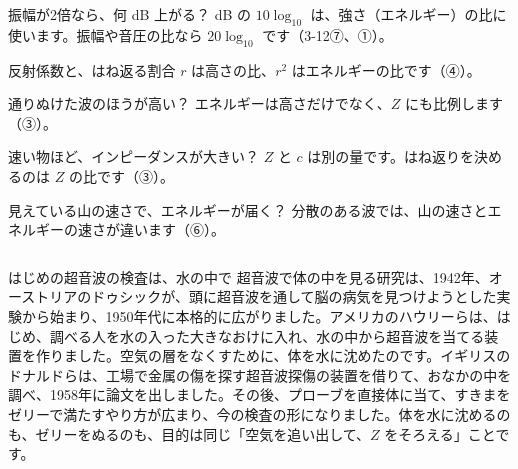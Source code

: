 \begin{tsumazuki}{振幅が2倍なら、何 dB 上がる？}
dB の $10\log_{10}$ は、強さ（エネルギー）の比に使います。振幅や音圧の比なら $20\log_{10}$ です（3-12⑦、①）。
\end{tsumazuki}

\begin{tsumazuki}{反射係数と、はね返る割合}
$r$ は高さの比、$r^2$ はエネルギーの比です（④）。
\end{tsumazuki}

\begin{tsumazuki}{通りぬけた波のほうが高い？}
エネルギーは高さだけでなく、$Z$ にも比例します（③）。
\end{tsumazuki}

\begin{tsumazuki}{速い物ほど、インピーダンスが大きい？}
$Z$ と $c$ は別の量です。はね返りを決めるのは $Z$ の比です（③）。
\end{tsumazuki}

\begin{tsumazuki}{見えている山の速さで、エネルギーが届く？}
分散のある波では、山の速さとエネルギーの速さが違います（⑥）。
\end{tsumazuki}

\begin{column}{はじめの超音波の検査は、水の中で}
超音波で体の中を見る研究は、1942年、オーストリアのドゥシックが、頭に超音波を通して脳の病気を見つけようとした実験から始まり、1950年代に本格的に広がりました。アメリカのハウリーらは、はじめ、調べる人を水の入った大きなおけに入れ、水の中から超音波を当てる装置を作りました。空気の層をなくすために、体を水に沈めたのです。イギリスのドナルドらは、工場で金属の傷を探す超音波探傷の装置を借りて、おなかの中を調べ、1958年に論文を出しました。その後、プローブを直接体に当て、すきまをゼリーで満たすやり方が広まり、今の検査の形になりました。体を水に沈めるのも、ゼリーをぬるのも、目的は同じ「空気を追い出して、$Z$ をそろえる」ことです。
\end{column}


